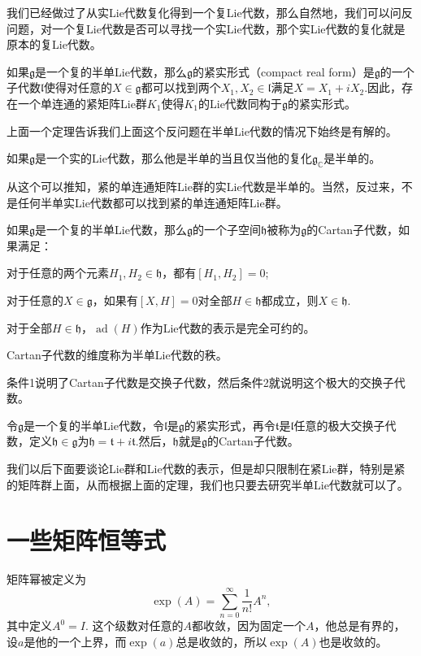 \documentclass[11pt]{article}
\theoremstyle{definition}
\theoremstyle{plain}
\newcommand{\cc}{\mathbb{C}}
\newcommand{\lag}{{\mathfrak{g}}}
\DeclareMathOperator{\ad}{ad}
\begin{document}
我们已经做过了从实Lie代数复化得到一个复Lie代数，那么自然地，我们可以问反问题，对一个复Lie代数是否可以寻找一个实Lie代数，那个实Lie代数的复化就是原本的复Lie代数。

\para 如果$\lag$是一个复的半单Lie代数，那么$\lag$的紧实形式（compact real form）是$\lag$的一个子代数$\mathfrak{l}$使得对任意的$X\in\lag$都可以找到两个$X_1,X_2\in\mathfrak{l}$满足$X=X_1+iX_2$.因此，存在一个单连通的紧矩阵Lie群$K_1$使得$K_1$的Lie代数同构于$\lag$的紧实形式。

上面一个定理告诉我们上面这个反问题在半单Lie代数的情况下始终是有解的。

{\pro 如果$\lag$是一个实的Lie代数，那么他是半单的当且仅当他的复化$\lag_\cc$是半单的。\endpro}

从这个可以推知，紧的单连通矩阵Lie群的实Lie代数是半单的。当然，反过来，不是任何半单实Lie代数都可以找到紧的单连通矩阵Lie群。

\para 如果$\lag$是一个复的半单Lie代数，那么$\lag$的一个子空间$\mathfrak{h}$被称为$\lag$的Cartan子代数，如果满足：

 对于任意的两个元素$H_1,H_2\in\mathfrak{h}$，都有$[H_1,H_2]=0$;

 对于任意的$X\in \lag$，如果有$[X,H]=0$对全部$H\in\mathfrak{h}$都成立，则$X\in \mathfrak{h}$.

 对于全部$H\in \mathfrak{h}$，$\ad(H)$作为Lie代数的表示是完全可约的。

Cartan子代数的维度称为半单Lie代数的秩。

条件1说明了Cartan子代数是交换子代数，然后条件2就说明这个极大的交换子代数。

{\pro 令$\lag$是一个复的半单Lie代数，令$\mathfrak{l}$是$\lag$的紧实形式，再令$\mathfrak{t}$是$\mathfrak{l}$任意的极大交换子代数，定义$\mathfrak{h}\in\lag$为$\mathfrak{h}=\mathfrak{t}+i\mathfrak{t}$.然后，$\mathfrak{h}$就是$\lag$的Cartan子代数。\endpro}

我们以后下面要谈论Lie群和Lie代数的表示，但是却只限制在紧Lie群，特别是紧的矩阵群上面，从而根据上面的定理，我们也只要去研究半单Lie代数就可以了。

\newpage

\section{一些矩阵恒等式}

矩阵幂被定义为
\[
	\exp(A)=\sum_{n=0}^\infty \frac{1}{n!}A^n,
\]
其中定义$A^0=I$. 这个级数对任意的$A$都收敛，因为固定一个$A$，他总是有界的，设$a$是他的一个上界，而$\exp(a)$总是收敛的，所以$\exp(A)$也是收敛的。
\end{document}
